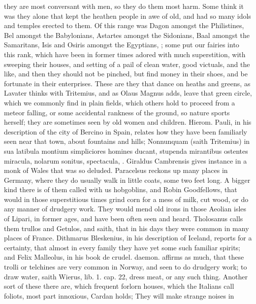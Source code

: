 {they are most conversant with men, so they do them most harm. Some
think it was they alone that kept the heathen people in awe of old, and
had so many idols and temples erected to them. Of this range was Dagon
amongst the Philistines, Bel amongst the Babylonians, Astartes amongst
the Sidonians, Baal amongst the Samaritans, Isis and Osiris amongst the
Egyptians, \etc{}; some put our fairies into this rank, which have
been in former times adored with much superstition, with sweeping their
houses, and setting of a pail of clean water, good victuals, and the
like, and then they should not be pinched, but find money in their
shoes, and be fortunate in their enterprises. These are they that dance
on heaths and greens, as  Lavater thinks with Tritemius, and as
Olaus Magnus adds, leave that green circle, which we commonly
find in plain fields, which others hold to proceed from a meteor
falling, or some accidental rankness of the ground, so nature sports
herself; they are sometimes seen by old women and children. Hierom.
Pauli, in his description of the city of Bercino in Spain, relates how
they have been familiarly seen near that town, about fountains and
hills; Nonnunquam (saith Tritemius) in sua latibula montium
simpliciores homines ducant, stupenda mirantibus ostentes miracula,
nolarum sonitus, spectacula, \etc{}. Giraldus Cambrensis gives
instance in a monk of Wales that was so deluded. Paracelsus
reckons up many places in Germany, where they do usually walk in little
coats, some two feet long. A bigger kind there is of them called with
us hobgoblins, and Robin Goodfellows, that would in those superstitious
times grind corn for a mess of milk, cut wood, or do any manner of
drudgery work. They would mend old irons in those Aeolian isles of
Lipari, in former ages, and have been often seen and heard.
Tholosanus calls them trullos and Getulos, and saith, that in his
days they were common in many places of France. Dithmarus Bleskenius,
in his description of Iceland, reports for a certainty, that almost in
every family they have yet some such familiar spirits; and Felix
Malleolus, in his book de crudel. daemon. affirms as much, that these
trolli or telchines are very common in Norway, and  seen to do
drudgery work; to draw water, saith Wierus, lib. 1. cap. 22, dress
meat, or any such thing. Another sort of these there are, which
frequent forlorn houses, which the Italians call foliots, most
part innoxious, Cardan holds; They will make strange noises in
}
